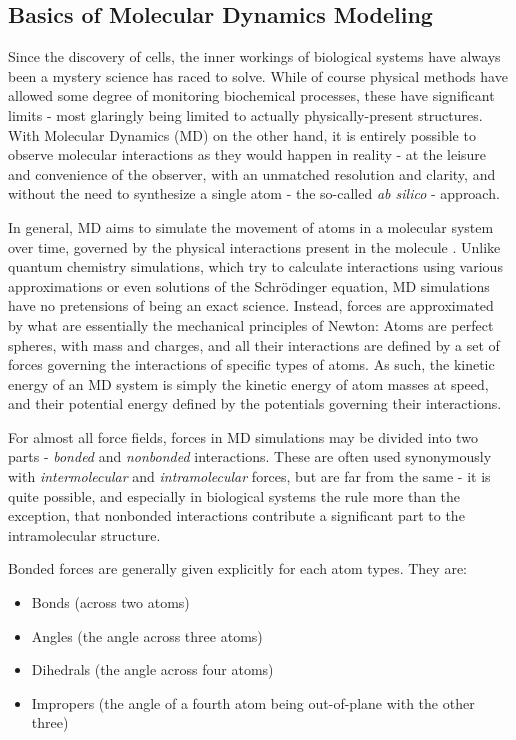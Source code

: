 \documentclass[oneside]{scrreprt}
\begin{document}
\subsection{Basics of Molecular Dynamics Modeling}

Since the discovery of cells, the inner workings of biological systems have always been a mystery science has raced to solve. While of course physical methods have allowed some degree of monitoring biochemical processes, these have significant limits - most glaringly being limited to actually physically-present structures. With Molecular Dynamics (MD) on the other hand, it is entirely possible to observe molecular interactions as they would happen in reality - at the leisure and convenience of the observer, with an unmatched resolution and clarity, and without the need to synthesize a single atom - the so-called \emph{ab silico} - approach.

In general, MD aims to simulate the movement of atoms in a molecular system over time, governed by the physical interactions present in the molecule \supercite{Hollingsworth2018Sep}. Unlike quantum chemistry simulations, which try to calculate interactions using various approximations or even solutions of the Schrödinger equation, MD simulations have no pretensions of being an exact science. Instead, forces are approximated by what are essentially the mechanical principles of Newton: Atoms are perfect spheres, with mass and charges, and all their interactions are defined by a set of forces governing the interactions of specific types of atoms. As such, the kinetic energy of an MD system is simply the kinetic energy of atom masses at speed, and their potential energy defined by the potentials governing their interactions.

For almost all force fields, forces in MD simulations may be divided into two parts - \emph{bonded} and \emph{nonbonded} interactions. These are often used synonymously with \emph{intermolecular} and \emph{intramolecular} forces, but are far from the same - it is quite possible, and especially in biological systems the rule more than the exception, that nonbonded interactions contribute a significant part to the intramolecular structure.

Bonded forces are generally given explicitly for each atom types. They are:
\begin{itemize}
    \item Bonds (across two atoms)
    \item Angles (the angle across three atoms)
    \item Dihedrals (the angle across four atoms)
    \item Impropers (the angle of a fourth atom being out-of-plane with the other three)
\end{itemize}
\end{document}
